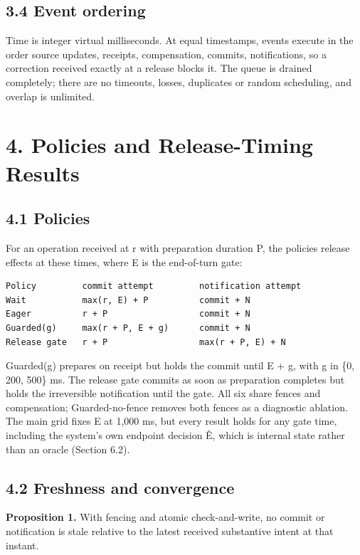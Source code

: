 \documentclass[11pt]{article}
\begin{document}
\subsection*{3.4 Event ordering}

Time is integer virtual milliseconds. At equal timestamps, events execute in the order source updates, receipts, compensation, commits, notifications, so a correction received exactly at a release blocks it. The queue is drained completely; there are no timeouts, losses, duplicates or random scheduling, and overlap is unlimited.


\section*{4. Policies and Release-Timing Results}

\subsection*{4.1 Policies}

For an operation received at r with preparation duration P, the policies release effects at these times, where E is the end-of-turn gate:


\begin{lstlisting}
Policy         commit attempt         notification attempt
Wait           max(r, E) + P          commit + N
Eager          r + P                  commit + N
Guarded(g)     max(r + P, E + g)      commit + N
Release gate   r + P                  max(r + P, E) + N
\end{lstlisting}

Guarded(g) prepares on receipt but holds the commit until E + g, with g in \{0, 200, 500\} ms. The release gate commits as soon as preparation completes but holds the irreversible notification until the gate. All six share fences and compensation; Guarded-no-fence removes both fences as a diagnostic ablation. The main grid fixes E at 1,000 ms, but every result holds for any gate time, including the system's own endpoint decision Ê, which is internal state rather than an oracle (Section 6.2).


\subsection*{4.2 Freshness and convergence}

\textbf{Proposition 1.} With fencing and atomic check-and-write, no commit or notification is stale relative to the latest received substantive intent at that instant.
\end{document}
